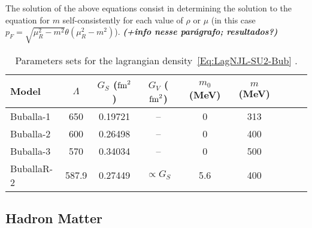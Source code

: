 \documentclass[prc, reprint, amsmath, linenumbers,10pt]{revtex4-1}
\newcommand{\comment}[1]{{\bf\textit{#1}}}
\begin{document}
The solution of the above equations consist in determining the solution to the equation for $m$ self-consistently for each value of $\rho$ or $\mu$ (in this case $p_F = \sqrt{\mu_R^2 - m^2}\theta(\mu_R^2 - m^2)$). \comment{(+info nesse parágrafo; resultados?)}

\begin{table*}
\caption{Parameters sets for the lagrangian density~\eqref{Eq:LagNJL-SU2-Bub} \cite{Buballa1996, Buballa2005}. \label{Tab:Parametros_NJL}}
\begin{ruledtabular}
\begin{tabular}{lcccccccc}
Model &  $\Lambda$ & $G_S$ ($\rm{fm}^2$) & $G_V$ ($\rm{fm}^2$) & $m_0$ (MeV) & $m$ (MeV) \\
\hline
Buballa-1 & 650 & 0.19721 & -- & 0 & 313 \\
Buballa-2 & 600 & 0.26498 & -- & 0 & 400 \\
Buballa-3 & 570 & 0.34034 & -- & 0 & 500 \\
BuballaR-2 & 587.9 & 0.27449 & $\propto G_S$ & 5.6 & 400 \\
\end{tabular}
\end{ruledtabular}
\end{table*}

\subsection{Hadron Matter}
\end{document}

